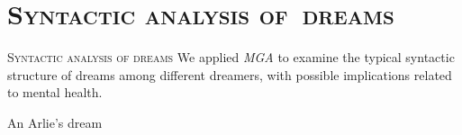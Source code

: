 \documentclass[xcolor=x11names,compress]{beamer}
\begin{document}
\section{\scshape Syntactic analysis of~dreams}
{
\begin{frame}[c]{}
    \centering
    {\scshape \LARGE \color{redUnicam} Syntactic analysis of dreams} \newline \newline
    {We applied {\it MGA} to examine the typical syntactic structure of dreams among different dreamers,
        with possible implications related to mental health.}
\end{frame}}

{
\begin{frame}[t]{An Arlie's dream}
    \vspace{-0.2cm}
    
\end{frame}}
\end{document}
